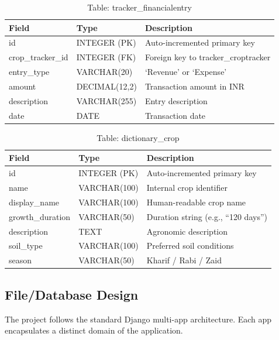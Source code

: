 \documentclass[12pt,a4paper]{article}
\begin{document}
\begin{table}[h]
\caption{Table: tracker\_financialentry}
\centering
\begin{tabular}{|l|l|p{6cm}|}
\hline
\textbf{Field} & \textbf{Type} & \textbf{Description} \\ \hline
id & INTEGER (PK) & Auto-incremented primary key \\ \hline
crop\_tracker\_id & INTEGER (FK) & Foreign key to tracker\_croptracker \\ \hline
entry\_type & VARCHAR(20) & `Revenue' or `Expense' \\ \hline
amount & DECIMAL(12,2) & Transaction amount in INR \\ \hline
description & VARCHAR(255) & Entry description \\ \hline
date & DATE & Transaction date \\ \hline
\end{tabular}
\end{table}

\begin{table}[h]
\caption{Table: dictionary\_crop}
\centering
\begin{tabular}{|l|l|p{6cm}|}
\hline
\textbf{Field} & \textbf{Type} & \textbf{Description} \\ \hline
id & INTEGER (PK) & Auto-incremented primary key \\ \hline
name & VARCHAR(100) & Internal crop identifier \\ \hline
display\_name & VARCHAR(100) & Human-readable crop name \\ \hline
growth\_duration & VARCHAR(50) & Duration string (e.g., ``120 days'') \\ \hline
description & TEXT & Agronomic description \\ \hline
soil\_type & VARCHAR(100) & Preferred soil conditions \\ \hline
season & VARCHAR(50) & Kharif / Rabi / Zaid \\ \hline
\end{tabular}
\end{table}

\subsection{File/Database Design}

The project follows the standard Django multi-app architecture. Each app encapsulates a distinct domain of the application.
\end{document}
